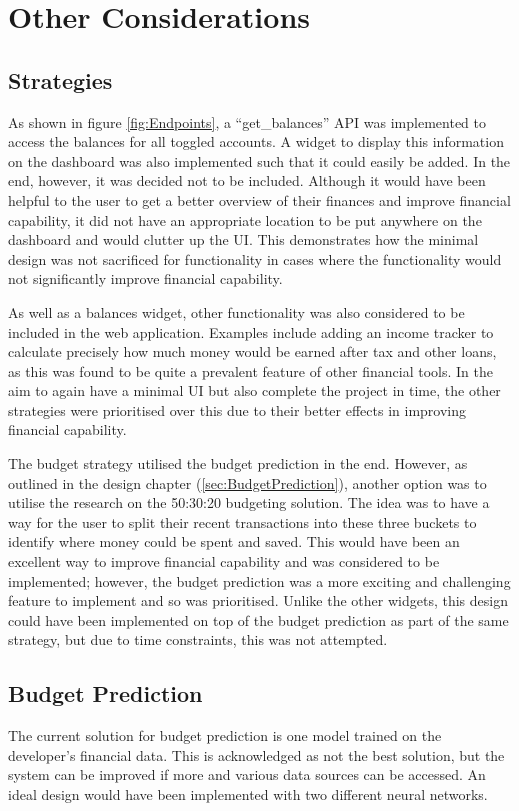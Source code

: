 \section{Other Considerations}

\subsection{Strategies}
As shown in figure \ref{fig:Endpoints}, a ``get\_balances'' API was implemented to access the balances for all toggled accounts. A widget to display this information on the dashboard was also implemented such that it could easily be added. In the end, however, it was decided not to be included. Although it would have been helpful to the user to get a better overview of their finances and improve financial capability, it did not have an appropriate location to be put anywhere on the dashboard and would clutter up the UI. This demonstrates how the minimal design was not sacrificed for functionality in cases where the functionality would not significantly improve financial capability.

As well as a balances widget, other functionality was also considered to be included in the web application. Examples include adding an income tracker to calculate precisely how much money would be earned after tax and other loans, as this was found to be quite a prevalent feature of other financial tools. In the aim to again have a minimal UI but also complete the project in time, the other strategies were prioritised over this due to their better effects in improving financial capability.

The budget strategy utilised the budget prediction in the end. However, as outlined in the design chapter (\ref{sec:BudgetPrediction}), another option was to utilise the research on the 50:30:20 budgeting solution. The idea was to have a way for the user to split their recent transactions into these three buckets to identify where money could be spent and saved. This would have been an excellent way to improve financial capability and was considered to be implemented; however, the budget prediction was a more exciting and challenging feature to implement and so was prioritised. Unlike the other widgets, this design could have been implemented on top of the budget prediction as part of the same strategy, but due to time constraints, this was not attempted.

\subsection{Budget Prediction}
The current solution for budget prediction is one model trained on the developer's financial data. This is acknowledged as not the best solution, but the system can be improved if more and various data sources can be accessed. An ideal design would have been implemented with two different neural networks.

